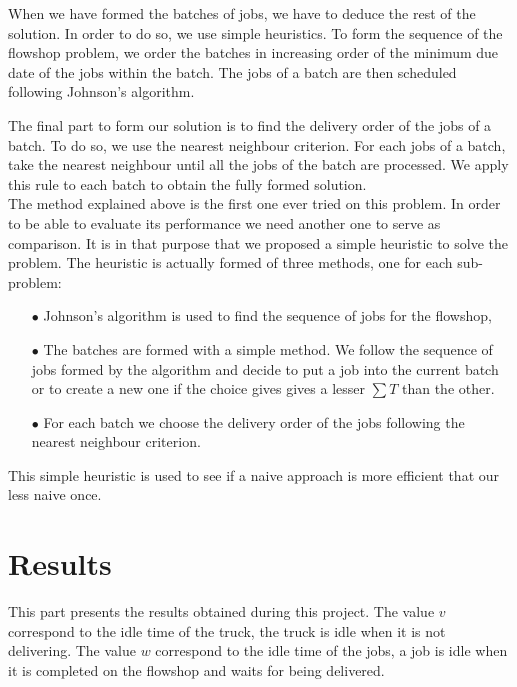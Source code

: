 \documentclass[UTF8, twoside]{EPURapport}
\begin{document}
\clearpage

	When we have formed the batches of jobs, we have to deduce the rest of the solution. In order to do so, we use simple heuristics. To form the sequence of the flowshop problem, we order the batches in increasing order of the minimum due date of the jobs within the batch. The jobs of a batch are then scheduled following Johnson's algorithm.
	
	The final part to form our solution is to find the delivery order of the jobs of a batch. To do so, we use the nearest neighbour criterion. For each jobs of a batch, take the nearest neighbour until all the jobs of the batch are processed. We apply this rule to each batch to obtain the fully formed solution.
\\

	The method explained above is the first one ever tried on this problem. In order to be able to evaluate its performance we need another one to serve as comparison. It is in that purpose that we proposed a simple heuristic to solve the problem. The heuristic is actually formed of three methods, one for each sub-problem:
\begin{itemize}
\item[$\bullet$] Johnson's algorithm is used to find the sequence of jobs for the flowshop,
\item[$\bullet$] The batches are formed with a simple method. We follow the sequence of jobs formed by the algorithm and decide to put a job into the current batch or to create a new one if the choice gives gives a lesser $\sum T$ than the other.
\item[$\bullet$] For each batch we choose the delivery order of the jobs following the nearest neighbour criterion.
\end{itemize}

	This simple heuristic is used to see if a naive approach is more efficient that our less naive once.
	
\chapter{Results}

	\hspace{4ex}This part presents the results obtained during this project. The value $v$ correspond to the idle time of the truck, the truck is idle when it is not delivering. The value $w$ correspond to the idle time of the jobs, a job is idle when it is completed on the flowshop and waits for being delivered.
	
\end{document}
